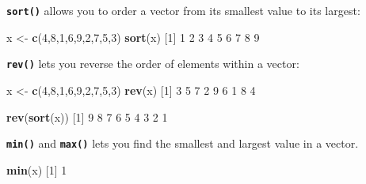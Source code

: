 \documentclass[
]{book}
\newenvironment{Shaded}{\begin{snugshade}}{\end{snugshade}}
\newcommand{\DecValTok}[1]{\textcolor[rgb]{0.00,0.00,0.81}{#1}}
\newcommand{\FunctionTok}[1]{\textcolor[rgb]{0.13,0.29,0.53}{\textbf{#1}}}
\newcommand{\NormalTok}[1]{#1}
\newcommand{\OtherTok}[1]{\textcolor[rgb]{0.56,0.35,0.01}{#1}}
\begin{document}
\textbf{\texttt{sort()}} allows you to order a vector from its smallest value to its largest:

\begin{Shaded}
\begin{Highlighting}[]
\NormalTok{x }\OtherTok{\textless{}{-}} \FunctionTok{c}\NormalTok{(}\DecValTok{4}\NormalTok{,}\DecValTok{8}\NormalTok{,}\DecValTok{1}\NormalTok{,}\DecValTok{6}\NormalTok{,}\DecValTok{9}\NormalTok{,}\DecValTok{2}\NormalTok{,}\DecValTok{7}\NormalTok{,}\DecValTok{5}\NormalTok{,}\DecValTok{3}\NormalTok{)}
\FunctionTok{sort}\NormalTok{(x)}
\NormalTok{[}\DecValTok{1}\NormalTok{] }\DecValTok{1} \DecValTok{2} \DecValTok{3} \DecValTok{4} \DecValTok{5} \DecValTok{6} \DecValTok{7} \DecValTok{8} \DecValTok{9}
\end{Highlighting}
\end{Shaded}

\textbf{\texttt{rev()}} lets you reverse the order of elements within a vector:

\begin{Shaded}
\begin{Highlighting}[]
\NormalTok{x }\OtherTok{\textless{}{-}} \FunctionTok{c}\NormalTok{(}\DecValTok{4}\NormalTok{,}\DecValTok{8}\NormalTok{,}\DecValTok{1}\NormalTok{,}\DecValTok{6}\NormalTok{,}\DecValTok{9}\NormalTok{,}\DecValTok{2}\NormalTok{,}\DecValTok{7}\NormalTok{,}\DecValTok{5}\NormalTok{,}\DecValTok{3}\NormalTok{)}
\FunctionTok{rev}\NormalTok{(x)}
\NormalTok{[}\DecValTok{1}\NormalTok{] }\DecValTok{3} \DecValTok{5} \DecValTok{7} \DecValTok{2} \DecValTok{9} \DecValTok{6} \DecValTok{1} \DecValTok{8} \DecValTok{4}
\end{Highlighting}
\end{Shaded}

\begin{Shaded}
\begin{Highlighting}[]
\FunctionTok{rev}\NormalTok{(}\FunctionTok{sort}\NormalTok{(x))}
\NormalTok{[}\DecValTok{1}\NormalTok{] }\DecValTok{9} \DecValTok{8} \DecValTok{7} \DecValTok{6} \DecValTok{5} \DecValTok{4} \DecValTok{3} \DecValTok{2} \DecValTok{1}
\end{Highlighting}
\end{Shaded}

\textbf{\texttt{min()}} and \textbf{\texttt{max()}} lets you find the smallest and largest value in a vector.

\begin{Shaded}
\begin{Highlighting}[]
\FunctionTok{min}\NormalTok{(x)}
\NormalTok{[}\DecValTok{1}\NormalTok{] }\DecValTok{1}
\end{Highlighting}
\end{Shaded}
\end{document}
